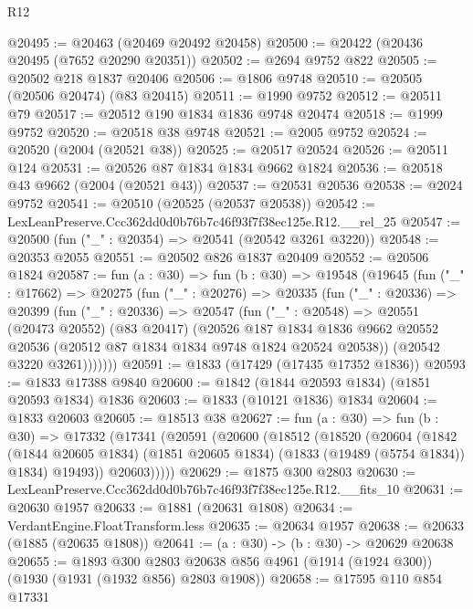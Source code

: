 \begin{lexlean}{R12}
\begin{coremodule}
@20495 := @20463 (@20469 @20492 @20458)
@20500 := @20422 (@20436 @20495 (@7652 @20290 @20351))
@20502 := @2694 @9752 @822
@20505 := @20502 @218 @1837 @20406
@20506 := @1806 @9748
@20510 := @20505 (@20506 @20474) (@83 @20415)
@20511 := @1990 @9752
@20512 := @20511 @79
@20517 := @20512 @190 @1834 @1836 @9748 @20474
@20518 := @1999 @9752
@20520 := @20518 @38 @9748
@20521 := @2005 @9752
@20524 := @20520 (@2004 (@20521 @38))
@20525 := @20517 @20524
@20526 := @20511 @124
@20531 := @20526 @87 @1834 @1834 @9662 @1824
@20536 := @20518 @43 @9662 (@2004 (@20521 @43))
@20537 := @20531 @20536
@20538 := @2024 @9752
@20541 := @20510 (@20525 (@20537 @20538))
@20542 := LexLeanPreserve.Ccc362dd0d0b76b7c46f93f7f38ec125e.R12.__rel_25
@20547 := @20500 (fun ("_" : @20354) => @20541 (@20542 @3261 @3220))
@20548 := @20353 @2055
@20551 := @20502 @826 @1837 @20409
@20552 := @20506 @1824
@20587 := fun (a : @30) =>
  fun (b : @30) =>
  @19548
    (@19645
      (fun ("_" : @17662) =>
      @20275
        (fun ("_" : @20276) =>
        @20335
          (fun ("_" : @20336) =>
          @20399
            (fun ("_" : @20336) =>
            @20547
              (fun ("_" : @20548) =>
              @20551
                (@20473 @20552)
                (@83 @20417)
                (@20526
                  @187
                  @1834
                  @1836
                  @9662
                  @20552
                  @20536
                  (@20512 @87 @1834 @1834 @9748 @1824 @20524 @20538))
                (@20542 @3220 @3261)))))))
@20591 := @1833 (@17429 (@17435 @17352 @1836))
@20593 := @1833 @17388 @9840
@20600 := @1842 (@1844 @20593 @1834) (@1851 @20593 @1834) @1836
@20603 := @1833 (@10121 @1836) @1834
@20604 := @1833 @20603
@20605 := @18513 @38
@20627 := fun (a : @30) =>
  fun (b : @30) =>
  @17332
    (@17341
      (@20591
        (@20600
          (@18512
            (@18520
              (@20604
                (@1842
                  (@1844 @20605 @1834)
                  (@1851 @20605 @1834)
                  (@1833 (@19489 (@5754 @1834)) @1834)
                  @19493))
              @20603)))))
@20629 := @1875 @300 @2803
@20630 := LexLeanPreserve.Ccc362dd0d0b76b7c46f93f7f38ec125e.R12.__fits_10
@20631 := @20630 @1957
@20633 := @1881 (@20631 @1808)
@20634 := VerdantEngine.FloatTransform.less
@20635 := @20634 @1957
@20638 := @20633 (@1885 (@20635 @1808))
@20641 := (a : @30) -> (b : @30) -> @20629 @20638
@20655 := @1893
    @300
    @2803
    @20638
    @856
    @4961
    (@1914 (@1924 @300))
    (@1930 (@1931 (@1932 @856) @2803 @1908))
@20658 := @17595 @110 @854 @17331

\end{coremodule}
\end{lexlean}
